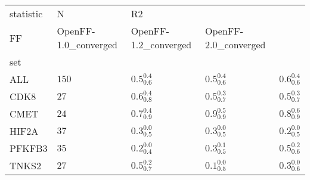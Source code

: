 \begin{tabular}{lllll}
\toprule
statistic &      N & \multicolumn{3}{l}{R2} \\
FF & OpenFF-1.0_converged & OpenFF-1.2_converged & OpenFF-2.0_converged \\
set    &        &                      &                      &                      \\
\midrule
ALL    &  $150$ &    $0.5^{0.4}_{0.6}$ &    $0.5^{0.4}_{0.6}$ &    $0.6^{0.4}_{0.6}$ \\
CDK8   &   $27$ &    $0.6^{0.4}_{0.8}$ &    $0.5^{0.3}_{0.7}$ &    $0.5^{0.3}_{0.7}$ \\
CMET   &   $24$ &    $0.7^{0.4}_{0.9}$ &    $0.9^{0.5}_{0.9}$ &    $0.8^{0.6}_{0.9}$ \\
HIF2A  &   $37$ &    $0.3^{0.0}_{0.5}$ &    $0.3^{0.0}_{0.5}$ &    $0.2^{0.0}_{0.5}$ \\
PFKFB3 &   $35$ &    $0.2^{0.0}_{0.4}$ &    $0.3^{0.1}_{0.5}$ &    $0.5^{0.2}_{0.6}$ \\
TNKS2  &   $27$ &    $0.5^{0.2}_{0.7}$ &    $0.1^{0.0}_{0.5}$ &    $0.3^{0.0}_{0.6}$ \\
\bottomrule
\end{tabular}
